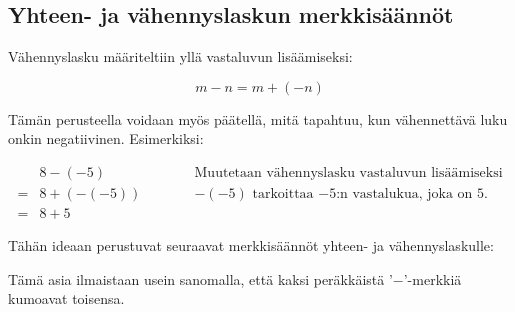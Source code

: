 
\subsection*{Yhteen- ja vähennyslaskun merkkisäännöt}

Vähennyslasku määriteltiin yllä vastaluvun lisäämiseksi:

\[m-n = m+(-n)\]

Tämän perusteella voidaan myös päätellä, mitä tapahtuu, kun vähennettävä luku onkin negatiivinen. Esimerkiksi:

\begin{align*}
&8-(-5)&\quad\quad\quad\textrm{Muutetaan vähennyslasku vastaluvun lisäämiseksi}\\
= &8+(-(-5))&\quad\quad\quad\textrm{$-(-5)$ tarkoittaa $-5$:n vastalukua, joka on 5.}\\
= &8+5
\end{align*}

Tähän ideaan perustuvat seuraavat merkkisäännöt yhteen- ja vähennyslaskulle:


Tämä asia ilmaistaan usein sanomalla, että kaksi peräkkäistä '$-$'-merkkiä kumoavat toisensa.


